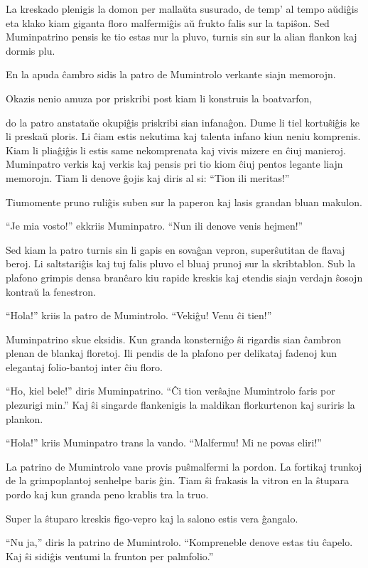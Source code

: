 La kreskado plenigis la domon per mallaŭta susurado, de temp' al tempo aŭdiĝis eta klako kiam giganta floro malfermiĝis aŭ frukto falis sur la tapiŝon. Sed Muminpatrino pensis ke tio estas nur la pluvo, turnis sin sur la alian flankon kaj dormis plu.

En la apuda ĉambro sidis la patro de Mumintrolo verkante siajn memorojn.

Okazis nenio amuza por priskribi post kiam li konstruis la boatvarfon,

do la patro anstataŭe okupiĝis priskribi sian infanaĝon. Dume li tiel kortuŝiĝis ke li preskaŭ ploris. Li ĉiam estis nekutima kaj talenta infano kiun neniu komprenis. Kiam li pliaĝiĝis li estis same nekomprenata kaj vivis mizere en ĉiuj manieroj. Muminpatro verkis kaj verkis kaj pensis pri tio kiom ĉiuj pentos legante liajn memorojn. Tiam li denove ĝojis kaj diris al si: ``Tion ili meritas!''

Tiumomente pruno ruliĝis suben sur la paperon kaj lasis grandan bluan makulon.

``Je mia vosto!'' ekkriis Muminpatro. ``Nun ili denove venis hejmen!''

Sed kiam la patro turnis sin li gapis en sovaĝan vepron, superŝutitan de flavaj beroj. Li saltstariĝis kaj tuj falis pluvo el bluaj prunoj sur la skribtablon. Sub la plafono grimpis densa branĉaro kiu rapide kreskis kaj etendis siajn verdajn ŝosojn kontraŭ la fenestron.

``Hola!'' kriis la patro de Mumintrolo. ``Vekiĝu! Venu ĉi tien!''

Muminpatrino skue eksidis. Kun granda konsterniĝo ŝi rigardis sian ĉambron plenan de blankaj floretoj. Ili pendis de la plafono per delikataj fadenoj kun elegantaj folio-bantoj inter ĉiu floro.

``Ho, kiel bele!'' diris Muminpatrino. ``Ĉi tion verŝajne Mumintrolo faris por plezurigi min.'' Kaj ŝi singarde flankenigis la maldikan florkurtenon kaj suriris la plankon.

``Hola!'' kriis Muminpatro trans la vando. ``Malfermu! Mi ne povas eliri!''

La patrino de Mumintrolo vane provis puŝmalfermi la pordon. La fortikaj trunkoj de la grimpoplantoj senhelpe baris ĝin. Tiam ŝi frakasis la vitron en la ŝtupara pordo kaj kun granda peno krablis tra la truo.

Super la ŝtuparo kreskis figo-vepro kaj la salono estis vera ĝangalo.

``Nu ja,'' diris la patrino de Mumintrolo. ``Kompreneble denove estas tiu ĉapelo. Kaj ŝi sidiĝis ventumi la frunton per palmfolio.''

